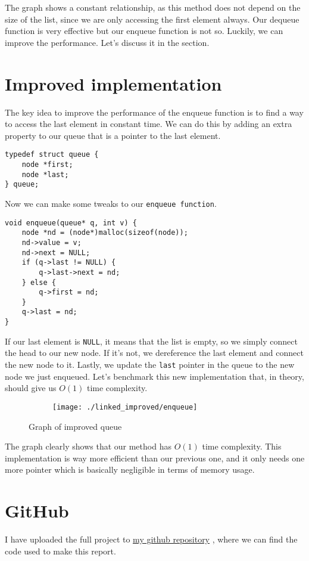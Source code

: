\documentclass[a4paper,11pt]{article}
\newcommand{\underlinehref}[2]{%
    \href{#1}{\ul{#2}}%
}
\begin{document}
    The graph shows a constant relationship, as this method does not depend on the size of the list, since we are only accessing the first element always.
    Our dequeue function is very effective but our enqueue function is not so.
    Luckily, we can improve the performance.
    Let's discuss it in the section.

    \section*{Improved implementation}

    The key idea to improve the performance of the enqueue function is to find a way to access the last element in constant time.
    We can do this by adding an extra property to our queue that is a pointer to the last element.

    \begin{verbatim}
typedef struct queue {
    node *first;
    node *last;
} queue;
    \end{verbatim}

    Now we can make some tweaks to our {\tt enqueue function}.

    \begin{verbatim}
void enqueue(queue* q, int v) {
    node *nd = (node*)malloc(sizeof(node));
    nd->value = v;
    nd->next = NULL;
    if (q->last != NULL) {
        q->last->next = nd;
    } else {
        q->first = nd;
    }
    q->last = nd;
}
    \end{verbatim}

    If our last element is {\tt NULL}, it means that the list is empty, so we simply connect the head to our new node.
    If it's not, we dereference the last element and connect the new node to it.
    Lastly, we update the {\tt last} pointer in the queue to the new node we just enqueued.
    Let's benchmark this new implementation that, in theory, should give us $O(1)$ time complexity.

    \begin{figure}[h]
        \centering
        \begin{subfigure}[b]{.5\textwidth}
            \centering
            \texttt{[image: ./linked\_improved/enqueue]} %
        \end{subfigure}
        \caption{Graph of improved queue}
        \label{fig:graph_3}
    \end{figure}

    The graph clearly shows that our method has $O(1)$ time complexity.
    This implementation is way more efficient than our previous one, and it only needs one more pointer which is basically negligible in terms of memory usage.

    \section*{GitHub}
    I have uploaded the full project to \underlinehref{https://github.com/peterherczku/ID1021/tree/main/assignment-6}{my github repository}, where we can find the code used to make this report.
\end{document}
